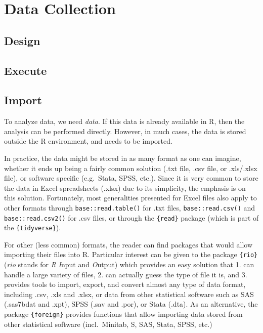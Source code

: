 \documentclass[
]{book}
\begin{document}
\hypertarget{data-collection}{%
\chapter{Data Collection}\label{data-collection}}

\hypertarget{design-1}{%
\section{Design}\label{design-1}}

\hypertarget{execute-1}{%
\section{Execute}\label{execute-1}}

\hypertarget{import-1}{%
\section{Import}\label{import-1}}

To analyze data, we need \emph{data}. If this data is already available in R, then the analysis can be performed directly. However, in much cases, the data is stored outside the R environment, and needs to be imported.

In practice, the data might be stored in as many format as one can imagine, whether it ends up being a fairly common solution (.txt file, .csv file, or .xls/.xlsx file), or software specific (e.g.~Stata, SPSS, etc.).
Since it is very common to store the data in Excel spreadsheets (.xlsx) due to its simplicity, the emphasis is on this solution. Fortunately, most generalities presented for Excel files also apply to other formats through \texttt{base::read.table()} for .txt files, \texttt{base::read.csv()} and \texttt{base::read.csv2()} for .csv files, or through the \texttt{\{read\}} package (which is part of the \texttt{\{tidyverse\}}).

For other (less common) formats, the reader can find packages that would allow importing their files into R. Particular interest can be given to the package \texttt{\{rio\}} (\emph{rio} stands for \emph{R} \emph{I}nput and \emph{O}utput) which provides an easy solution that 1. can handle a large variety of files, 2. can actually guess the type of file it is, and 3. provides tools to import, export, and convert almost any type of data format, including .csv, .xls and .xlsx, or data from other statistical software such as SAS (.sas7bdat and .xpt), SPSS (.sav and .por), or Stata (.dta). As an alternative, the package \texttt{\{foreign\}} provides functions that allow importing data stored from other statistical software (incl.~Minitab, S, SAS, Stata, SPSS, etc.)
\end{document}
